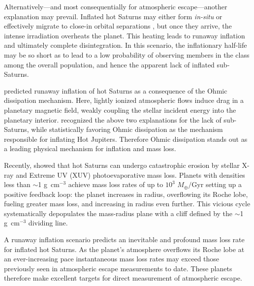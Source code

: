 \documentclass[twocolumn]{aastex631}
\begin{document}
Alternatively---and most consequentially for atmospheric escape---another explanation may prevail.  Inflated hot Saturns may either form \emph{in-situ} or effectively migrate to close-in orbital separations \citep{2018ARA&A..56..175D}, but once they arrive, the intense irradiation overheats the planet.  This heating leads to runaway inflation and ultimately complete disintegration.  In this scenario, the inflationary half-life may be so short as to lead to a low probability of observing members in the class among the overall population, and hence the apparent lack of inflated sub-Saturns.

\citet{2011ApJ...738....1B} predicted runaway inflation of hot Saturns as a consequence of the Ohmic dissipation mechanism.  Here, lightly ionized atmospheric flows induce drag in a planetary magnetic field, weakly coupling the stellar incident energy into the planetary interior.  \citet{2018AJ....155..214T} recognized the above two explanations for the lack of sub-Saturns, while statistically favoring Ohmic dissipation as the mechanism responsible for inflating Hot Jupiters.  Therefore Ohmic dissipation stands out as a leading physical mechanism for inflation and mass loss.

Recently, \citet{2023ApJ...945L..36T} showed that hot Saturns can undergo catastrophic erosion by stellar X-ray and Extreme UV (XUV) photoevaporative mass loss. Planets with densities less than $\sim$1 g~cm$^{-3}$ achieve mass loss rates of up to $10^3$ $M_\oplus /$Gyr setting up a positive feedback loop: the planet increases in radius, overflowing its Roche lobe, fueling greater mass loss, and increasing in radius even further.  This vicious cycle systematically depopulates the mass-radius plane with a cliff defined by the $\sim$1 g~cm$^{-3}$ dividing line.

A runaway inflation scenario predicts an inevitable and profound mass loss rate for inflated hot Saturns.  As the planet's atmosphere overflows its Roche lobe at an ever-increasing pace instantaneous mass loss rates may exceed those previously seen in atmospheric escape measurements to date.  These planets therefore make excellent targets for direct measurement of atmospheric escape.
\end{document}
